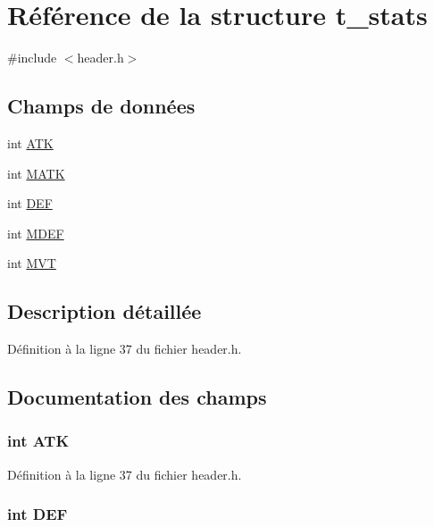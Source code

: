 \hypertarget{structt__stats}{\section{Référence de la structure t\-\_\-stats}
\label{structt__stats}
}


{\ttfamily \#include $<$header.\-h$>$}

\subsection*{Champs de données}
\begin{DoxyCompactItemize}
\item 
int \hyperlink{structt__stats_a3b3918526788ae6b163c41dc25326396}{A\-T\-K}
\item 
int \hyperlink{structt__stats_ae183b98dc9aca9905f531bfd4dd51a1c}{M\-A\-T\-K}
\item 
int \hyperlink{structt__stats_a30707041436614e9e3759b7bf533b201}{D\-E\-F}
\item 
int \hyperlink{structt__stats_a92ab6d75a95ed209b7875314f53fb555}{M\-D\-E\-F}
\item 
int \hyperlink{structt__stats_a397f7940443939415a50f324dc5f56f9}{M\-V\-T}
\end{DoxyCompactItemize}


\subsection{Description détaillée}


Définition à la ligne 37 du fichier header.\-h.



\subsection{Documentation des champs}
\hypertarget{structt__stats_a3b3918526788ae6b163c41dc25326396}{
\subsubsection[{A\-T\-K}]{\setlength{\rightskip}{0pt plus 5cm}int A\-T\-K}}\label{structt__stats_a3b3918526788ae6b163c41dc25326396}


Définition à la ligne 37 du fichier header.\-h.

\hypertarget{structt__stats_a30707041436614e9e3759b7bf533b201}{
\subsubsection[{D\-E\-F}]{\setlength{\rightskip}{0pt plus 5cm}int D\-E\-F}}\label{structt__stats_a30707041436614e9e3759b7bf533b201}


